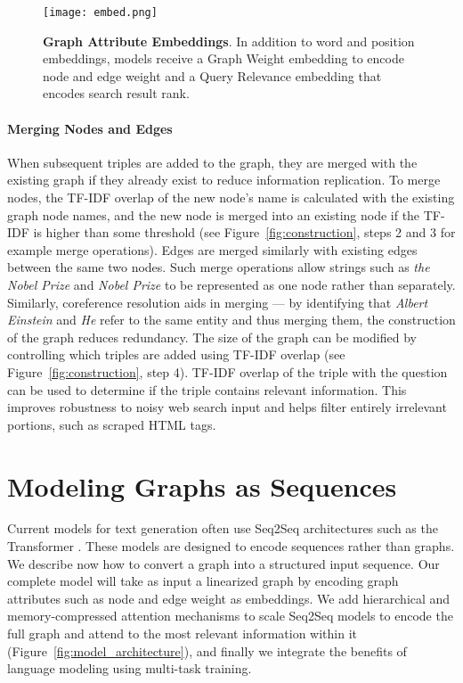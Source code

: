 \documentclass[11pt,a4paper]{article}
\begin{document}
\begin{figure*}[t!]
    \centering
    \texttt{[image: embed.png]}
    \caption{\textbf{Graph Attribute Embeddings}. In addition to word and position embeddings, models receive a Graph Weight embedding to encode node and edge weight and a Query Relevance embedding that encodes search result rank.}
    \label{fig:embed_example}
\end{figure*}


\paragraph{Merging Nodes and Edges} When subsequent triples are added to the graph, they are merged with the existing graph if they already exist to reduce information replication. To merge nodes, the TF-IDF overlap of the new node's name is calculated with the existing graph node names, and the new node is merged into an existing node if the TF-IDF is higher than some threshold (see Figure~\ref{fig:construction}, steps 2 and 3 for example merge operations). Edges are merged similarly with existing edges between the same two nodes. Such merge operations allow strings such as \textit{the Nobel Prize} and \textit{Nobel Prize} to be represented as one node rather than separately. Similarly,  coreference resolution aids in merging --- by identifying that \textit{Albert Einstein} and \textit{He} refer to the same entity and thus merging them, the construction of the graph reduces redundancy. 
The size of the graph can be modified by controlling which triples are added using TF-IDF overlap (see Figure~\ref{fig:construction}, step 4). TF-IDF overlap of the triple with the question can be used to determine if the triple contains relevant information. This improves robustness to noisy web search input and helps filter entirely irrelevant portions, such as scraped HTML tags.

\section{Modeling Graphs as Sequences}

Current models for text generation often use Seq2Seq architectures such as the Transformer \cite{vaswani2018attention}. These models are designed to encode sequences rather than graphs. We describe now how to convert a graph into a structured input sequence. Our complete model will take as input a linearized graph by encoding graph attributes such as node and edge weight as embeddings. We add hierarchical and memory-compressed attention mechanisms to scale Seq2Seq models to encode the full graph and attend to the most relevant information within it (Figure~\ref{fig:model_architecture}), and finally we integrate the benefits of language modeling using multi-task training. 
\end{document}
